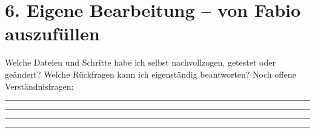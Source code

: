 \documentclass[a4paper,10pt]{article}
\begin{document}
\section*{6. Eigene Bearbeitung -- von Fabio auszufüllen}
Welche Dateien und Schritte habe ich selbst nachvollzogen, getestet oder geändert? Welche Rückfragen kann ich eigenständig beantworten? Noch offene Verständnisfragen:

\vspace{4mm}
\noindent\rule{\linewidth}{0.3pt}\par\vspace{5mm}
\noindent\rule{\linewidth}{0.3pt}\par\vspace{5mm}
\noindent\rule{\linewidth}{0.3pt}\par\vspace{5mm}
\noindent\rule{\linewidth}{0.3pt}
\end{document}
